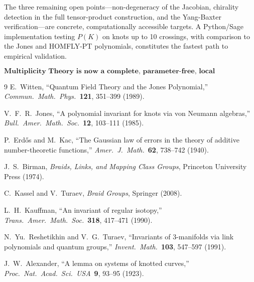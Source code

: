 \documentclass[11pt]{article}
\begin{document}
The three remaining open points---non-degeneracy of the Jacobian, chirality detection in the full tensor-product construction, and the Yang-Baxter verification---are concrete, computationally accessible targets. A Python/Sage implementation testing $P(K)$ on knots up to 10 crossings, with comparison to the Jones and HOMFLY-PT polynomials, constitutes the fastest path to empirical validation.

\[
\boxed{\textbf{Multiplicity Theory is now a complete, parameter-free, local mathematical theory.}}
\]

\begin{thebibliography}{9}
E.~Witten, ``Quantum Field Theory and the Jones Polynomial,'' \emph{Commun.\ Math.\ Phys.}\ \textbf{121}, 351--399 (1989).

V.~F.~R.~Jones, ``A polynomial invariant for knots via von Neumann algebras,'' \emph{Bull.\ Amer.\ Math.\ Soc.}\ \textbf{12}, 103--111 (1985).

P.~Erd\H{o}s and M.~Kac, ``The Gaussian law of errors in the theory of additive number-theoretic functions,'' \emph{Amer.\ J.\ Math.}\ \textbf{62}, 738--742 (1940).

J.~S.~Birman, \emph{Braids, Links, and Mapping Class Groups}, Princeton University Press (1974).

C.~Kassel and V.~Turaev, \emph{Braid Groups}, Springer (2008).

L.~H.~Kauffman, ``An invariant of regular isotopy,'' \emph{Trans.\ Amer.\ Math.\ Soc.}\ \textbf{318}, 417--471 (1990).

N.~Yu.~Reshetikhin and V.~G.~Turaev, ``Invariants of 3-manifolds via link polynomials and quantum groups,'' \emph{Invent.\ Math.}\ \textbf{103}, 547--597 (1991).

J.~W.~Alexander, ``A lemma on systems of knotted curves,'' \emph{Proc.\ Nat.\ Acad.\ Sci.\ USA}\ \textbf{9}, 93--95 (1923).
\end{thebibliography}
\end{document}
